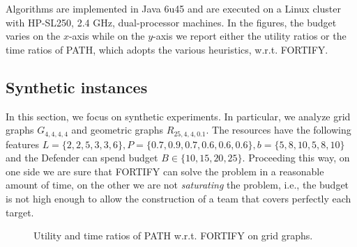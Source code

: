 Algorithms are implemented in Java 6u45 and are executed on a Linux cluster with HP-SL250, 2.4 GHz, dual-processor machines. In the figures, the budget varies on the $x$-axis while on the $y$-axis we report either the utility ratios or the time ratios of PATH, which adopts the various heuristics, w.r.t. FORTIFY.

\subsection{Synthetic instances}\label{sec:old_synth_comp}
In this section, we focus on synthetic experiments. In particular, we analyze grid graphs $G_{4,4,4,4}$ and geometric graphs $R_{25,4,4,0.1}$. The resources have the following features $L = \{2,2,5,3,3,6\}, P = \{0.7,0.9,0.7,0.6,0.6,0.6\}, b = \{5,8,10,5,8,10\}$ and the Defender can spend budget $B \in \{10, 15, 20, 25\}$. Proceeding this way, on one side we are sure that FORTIFY can solve the problem in a reasonable amount of time, on the other we are not \textit{saturating} the problem, i.e., the budget is not high enough to allow the construction of a team that covers perfectly each target.

\begin{figure}[!htbp]
\centering
{}
\caption{Utility and time ratios of PATH w.r.t. FORTIFY on grid graphs.}\label{fig:previous_grid}
\end{figure}

